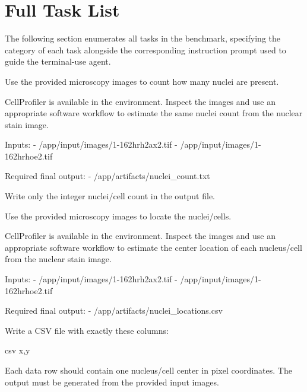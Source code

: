 \documentclass{llmxive}
\begin{document}
\section{Full Task List}

The following section enumerates all tasks in the benchmark, specifying the category of each task alongside the corresponding instruction prompt used to guide the terminal-use agent.

\begin{instructionbox}
Use the provided microscopy images to count how many nuclei are present.

CellProfiler is available in the environment. Inspect the images and use an appropriate software workflow to estimate the same nuclei count from the nuclear stain image.

Inputs:
- \textasciigrave{}/app/input/images/1-162hrh2ax2.tif\textasciigrave{}
- \textasciigrave{}/app/input/images/1-162hrhoe2.tif\textasciigrave{}

Required final output:
- \textasciigrave{}/app/artifacts/nuclei\_count.txt\textasciigrave{}

Write only the integer nuclei/cell count in the output file.
\end{instructionbox}

\begin{instructionbox}
Use the provided microscopy images to locate the nuclei/cells.

CellProfiler is available in the environment. Inspect the images and use an appropriate software workflow to estimate the center location of each nucleus/cell from the nuclear stain image.

Inputs:
- \textasciigrave{}/app/input/images/1-162hrh2ax2.tif\textasciigrave{}
- \textasciigrave{}/app/input/images/1-162hrhoe2.tif\textasciigrave{}

Required final output:
- \textasciigrave{}/app/artifacts/nuclei\_locations.csv\textasciigrave{}

Write a CSV file with exactly these columns:

\textasciigrave{}\textasciigrave{}\textasciigrave{}csv
x,y
\textasciigrave{}\textasciigrave{}\textasciigrave{}

Each data row should contain one nucleus/cell center in pixel coordinates. The output must be generated from the provided input images.
\end{instructionbox}
\end{document}
